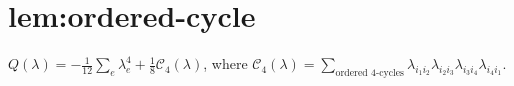\chapter{lem:ordered-cycle}\label{chap:lem_ordered_cycle}
\begin{lemma}\label{lem:ordered-cycle}
\leanok
$Q(\lambda)
=-\frac{1}{12}\sum_e\lambda_e^4+\frac18\mathcal{C}_4(\lambda)$,
where $\mathcal{C}_4(\lambda)=\sum_{\text{ordered 4-cycles}}\lambda_{i_1 i_2}\lambda_{i_2 i_3}\lambda_{i_3 i_4}\lambda_{i_4 i_1}$.
\end{lemma}
